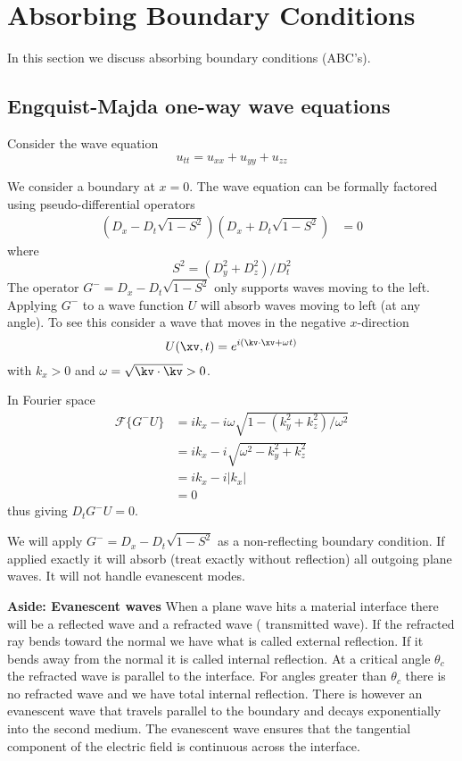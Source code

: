\section{Absorbing Boundary Conditions}\label{sec:abc}

In this section we discuss absorbing boundary conditions (ABC's).

\subsection{Engquist-Majda one-way wave equations}



Consider the wave equation
\[
   u_{tt} = u_{xx} + u_{yy}+ u_{zz}
\]

We consider a boundary at $x=0$. The wave equation can be formally factored using
pseudo-differential operators
\begin{align*}
   ( D_x - D_t\sqrt{ 1-S^2} )( D_x + D_t\sqrt{ 1-S^2}) &=0 
\end{align*}
where
\[
        S^2  = (D_y^2 + D_z^2)/D_t^2
\]
The operator $G^{-} =D_x - D_t\sqrt{ 1-S^2}$ only supports waves moving to
the left. Applying $G^{-}$ to a wave function $U$ will absorb waves
moving to left (at any angle).
To see this consider a wave that moves in the negative $x$-direction
\[
    U(\xv,t) = e^{ i(\kv\cdot\xv + \omega t)}
\]
with $k_x>0$ and $\omega=\sqrt{ \kv\cdot\kv}>0$.

In Fourier space
\begin{align*}
   {\mathcal F}\{ G^{-} U \} &= ik_x - i\omega\sqrt{ 1 - (k_y^2+k_z^2)/\omega^2}  \\
        &= i k_x - i\sqrt{ \omega^2 - {k_y^2+k_z^2} } \\
        &= i k_x - i |k_x| \\
        &= 0 
\end{align*}
thus giving $D_t G^{-} U=0$. 

We will apply $G^{-} =D_x - D_t\sqrt{ 1-S^2}$ as a non-reflecting boundary condition. If applied
exactly it will absorb (treat exactly without reflection) all outgoing plane waves. It will
not handle evanescent modes. 

{\bf Aside: Evanescent waves} When a plane wave hits a material interface there will be a reflected
wave and a refracted wave ( transmitted wave). If the refracted ray bends toward the normal we have
what is called external reflection. If it bends away from the normal it is called internal reflection.
At a critical angle $\theta_c$ the refracted wave is parallel to the interface. For angles
greater than $\theta_c$ there is no refracted wave 
and we have total internal reflection. There is however an evanescent wave that
travels parallel to the boundary and decays exponentially into the second medium. The evanescent wave
 ensures that
the tangential component of the electric field is continuous across the interface. 


